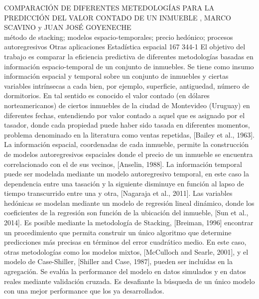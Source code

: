 \A
{COMPARACIÓN DE DIFERENTES METEDOLOGÍAS PARA LA PREDICCIÓN DEL VALOR CONTADO DE UN INMUEBLE}
{, MARCO SCAVINO y JUAN JOSÉ GOYENECHE}
{
\\}
{método de stacking; modelos espacio-temporales; precio hedónico; procesos autoregresivos} 
 {Otras aplicaciones} 
 {Estadística espacial} 
 {167} 
 {344-1}
{El objetivo del trabajo es comparar la eficiencia predictiva de diferentes metodologías basadas en información espacio-temporal de un conjunto de inmuebles. Se tiene como insumo información espacial y temporal sobre un conjunto de inmuebles y ciertas variables intrínsecas a cada bien, por ejemplo, superficie, antiguedad, número de dormitorios. En tal sentido es conocido el valor contado (en dólares norteamericanos) de ciertos inmuebles de la ciudad de Montevideo (Uruguay) en diferentes fechas, entendiendo por valor contado a aquel que es asignado por el tasador, donde cada propiedad puede haber sido tasada en diferentes momentos, problema denominado en la literatura como ventas repetidas, [Bailey et al., 1963]. La información espacial, coordenadas de cada inmueble, permite la construcción de modelos autoregresivos espaciales donde el precio de un inmueble se encuentra correlacionado con el de sus vecinos, [Anselin, 1988]. La información temporal puede ser modelada mediante un modelo autoregresivo temporal, en este caso la dependencia entre una tasación y la siguiente disminuye en función al lapso de tiempo transcurrido entre una y otra, [Nagaraja et al., 2011]. Las variables hedónicas se modelan mediante un modelo de regresión lineal dinámico, donde los coeficientes de la regresión son función de la ubicación del inmueble, [Sun et al., 2014]. Es posible mediante la metodología de Stacking, [Breiman, 1996] encontrar un procedimiento que permita construir un único algoritmo que determine predicciones más precisas en términos del error cuadrático medio. En este caso, otras metodologías como los modelos mixtos, [McCulloch and Searle, 2001], y el modelo de Case-Shiller, [Shiller and Case, 1987], pueden ser incluídas en la agregación. Se evalúa la performance del modelo en datos simulados y en datos reales mediante validación cruzada. Es desafiante la búsqueda de un único modelo con una mejor performance que los ya desarrollados.}
